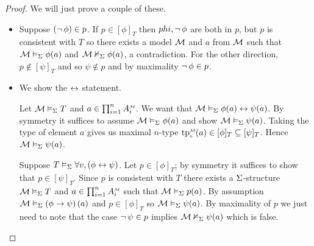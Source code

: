 \begin{proof}
    We will just prove a couple of these.
    \begin{itemize}
        \item Suppose $(\neg\, \phi) \in p$.
            If $p \in [\phi]_T$ then $phi, \neg\, \phi$ are both in $p$,
            but $p$ is consistent with $T$ so
            there exists a model $\mathcal{M}$ and $a$ from 
            $\mathcal{M}$ such that
            $\mathcal{M} \vDash_{\Sigma} \phi(a)$ and $\mathcal{M} \nvDash_{\Sigma} \phi(a)$, 
            a contradiction.
            For the other direction, 
            $p \notin [\psi]_T$ and so $ \psi \notin p$ and
            by maximality $\neg\, \phi \in p$.
        \item We show the $\leftrightarrow$ statement. 
            \begin{forward}
                Let $\mathcal{M} \vDash_{\Sigma} T$ and 
                $a \in \prod_{i=1}^n \mmintp{A_i}$.
                We want that $\mathcal{M} \vDash_{\Sigma} \phi(a) \leftrightarrow \psi(a)$.
                By symmetry it suffices to assume $\mathcal{M} \vDash_{\Sigma} \phi(a)$ 
                and show $\mathcal{M} \vDash_{\Sigma} \psi(a)$.
                Taking the type of element $a$ gives us maximal $n$-type
                $\subintp{n}{\MM}{\tp}(a) \in [\phi]_T \subs [\psi]_T$.
                Hence $\mathcal{M} \vDash_{\Sigma} \psi(a)$.
            \end{forward}
            \begin{backward}
                Suppose $T \vDash_{\Sigma} \forall v, \left(\phi \leftrightarrow \psi\right)$.
                Let $p \in [\phi]_T$; by symmetry it suffices
                to show that $p \in [\psi]_T$.
                Since $p$ is consistent with $T$ there exists a $\Sigma$-structure
                $\mathcal{M} \vDash_{\Sigma} T$ and 
                $a \in \prod_{i=1}^n \mmintp{A_i}$ such that 
                $\mathcal{M} \vDash_{\Sigma} p(a)$.
                By assumption $\mathcal{M} \vDash_{\Sigma} \left(\phi \to \psi\right)(a)$
                and $p \in [\phi]_T$ so 
                $\mathcal{M} \vDash_{\Sigma} \psi(a)$.
                By maximality of $p$ we just need to note that the case
                $\neg\, \psi \in p$ implies $\mathcal{M} \nvDash_{\Sigma} \psi(a)$
                which is false.
            \end{backward}
    \end{itemize}
\end{proof}

